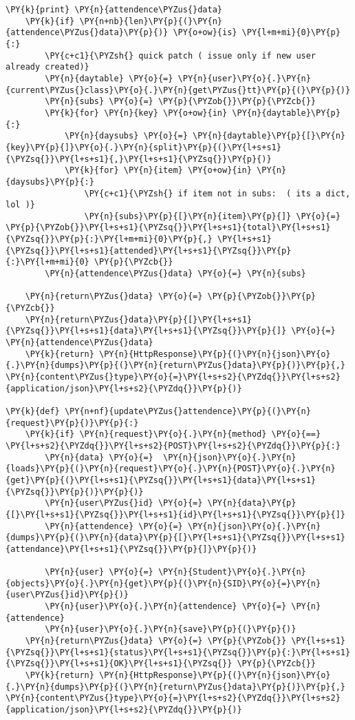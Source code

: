 \begin{Verbatim}[commandchars=\\\{\}]
    \PY{k}{print} \PY{n}{attendence\PYZus{}data}
    \PY{k}{if} \PY{n+nb}{len}\PY{p}{(}\PY{n}{attendence\PYZus{}data}\PY{p}{)} \PY{o+ow}{is} \PY{l+m+mi}{0}\PY{p}{:}
        \PY{c+c1}{\PYZsh{} quick patch ( issue only if new user already created)}
        \PY{n}{daytable} \PY{o}{=} \PY{n}{user}\PY{o}{.}\PY{n}{current\PYZus{}class}\PY{o}{.}\PY{n}{get\PYZus{}tt}\PY{p}{(}\PY{p}{)}
        \PY{n}{subs} \PY{o}{=} \PY{p}{\PYZob{}}\PY{p}{\PYZcb{}}
        \PY{k}{for} \PY{n}{key} \PY{o+ow}{in} \PY{n}{daytable}\PY{p}{:}
            \PY{n}{daysubs} \PY{o}{=} \PY{n}{daytable}\PY{p}{[}\PY{n}{key}\PY{p}{]}\PY{o}{.}\PY{n}{split}\PY{p}{(}\PY{l+s+s1}{\PYZsq{}}\PY{l+s+s1}{,}\PY{l+s+s1}{\PYZsq{}}\PY{p}{)}
            \PY{k}{for} \PY{n}{item} \PY{o+ow}{in} \PY{n}{daysubs}\PY{p}{:}
                \PY{c+c1}{\PYZsh{} if item not in subs:  ( its a dict, lol )}
                \PY{n}{subs}\PY{p}{[}\PY{n}{item}\PY{p}{]} \PY{o}{=} \PY{p}{\PYZob{}}\PY{l+s+s1}{\PYZsq{}}\PY{l+s+s1}{total}\PY{l+s+s1}{\PYZsq{}}\PY{p}{:}\PY{l+m+mi}{0}\PY{p}{,} \PY{l+s+s1}{\PYZsq{}}\PY{l+s+s1}{attended}\PY{l+s+s1}{\PYZsq{}}\PY{p}{:}\PY{l+m+mi}{0} \PY{p}{\PYZcb{}}
        \PY{n}{attendence\PYZus{}data} \PY{o}{=} \PY{n}{subs}

    \PY{n}{return\PYZus{}data} \PY{o}{=} \PY{p}{\PYZob{}}\PY{p}{\PYZcb{}}
    \PY{n}{return\PYZus{}data}\PY{p}{[}\PY{l+s+s1}{\PYZsq{}}\PY{l+s+s1}{data}\PY{l+s+s1}{\PYZsq{}}\PY{p}{]} \PY{o}{=} \PY{n}{attendence\PYZus{}data}
    \PY{k}{return} \PY{n}{HttpResponse}\PY{p}{(}\PY{n}{json}\PY{o}{.}\PY{n}{dumps}\PY{p}{(}\PY{n}{return\PYZus{}data}\PY{p}{)}\PY{p}{,} \PY{n}{content\PYZus{}type}\PY{o}{=}\PY{l+s+s2}{\PYZdq{}}\PY{l+s+s2}{application/json}\PY{l+s+s2}{\PYZdq{}}\PY{p}{)}

\PY{k}{def} \PY{n+nf}{update\PYZus{}attendence}\PY{p}{(}\PY{n}{request}\PY{p}{)}\PY{p}{:}
    \PY{k}{if} \PY{n}{request}\PY{o}{.}\PY{n}{method} \PY{o}{==} \PY{l+s+s2}{\PYZdq{}}\PY{l+s+s2}{POST}\PY{l+s+s2}{\PYZdq{}}\PY{p}{:}
        \PY{n}{data} \PY{o}{=}  \PY{n}{json}\PY{o}{.}\PY{n}{loads}\PY{p}{(}\PY{n}{request}\PY{o}{.}\PY{n}{POST}\PY{o}{.}\PY{n}{get}\PY{p}{(}\PY{l+s+s1}{\PYZsq{}}\PY{l+s+s1}{data}\PY{l+s+s1}{\PYZsq{}}\PY{p}{)}\PY{p}{)}
        \PY{n}{user\PYZus{}id} \PY{o}{=} \PY{n}{data}\PY{p}{[}\PY{l+s+s1}{\PYZsq{}}\PY{l+s+s1}{id}\PY{l+s+s1}{\PYZsq{}}\PY{p}{]}
        \PY{n}{attendence} \PY{o}{=} \PY{n}{json}\PY{o}{.}\PY{n}{dumps}\PY{p}{(}\PY{n}{data}\PY{p}{[}\PY{l+s+s1}{\PYZsq{}}\PY{l+s+s1}{attendance}\PY{l+s+s1}{\PYZsq{}}\PY{p}{]}\PY{p}{)}

        \PY{n}{user} \PY{o}{=} \PY{n}{Student}\PY{o}{.}\PY{n}{objects}\PY{o}{.}\PY{n}{get}\PY{p}{(}\PY{n}{SID}\PY{o}{=}\PY{n}{user\PYZus{}id}\PY{p}{)}
        \PY{n}{user}\PY{o}{.}\PY{n}{attendence} \PY{o}{=} \PY{n}{attendence}
        \PY{n}{user}\PY{o}{.}\PY{n}{save}\PY{p}{(}\PY{p}{)}
    \PY{n}{return\PYZus{}data} \PY{o}{=} \PY{p}{\PYZob{}} \PY{l+s+s1}{\PYZsq{}}\PY{l+s+s1}{status}\PY{l+s+s1}{\PYZsq{}}\PY{p}{:}\PY{l+s+s1}{\PYZsq{}}\PY{l+s+s1}{OK}\PY{l+s+s1}{\PYZsq{}} \PY{p}{\PYZcb{}}
    \PY{k}{return} \PY{n}{HttpResponse}\PY{p}{(}\PY{n}{json}\PY{o}{.}\PY{n}{dumps}\PY{p}{(}\PY{n}{return\PYZus{}data}\PY{p}{)}\PY{p}{,} \PY{n}{content\PYZus{}type}\PY{o}{=}\PY{l+s+s2}{\PYZdq{}}\PY{l+s+s2}{application/json}\PY{l+s+s2}{\PYZdq{}}\PY{p}{)}
\end{Verbatim}
